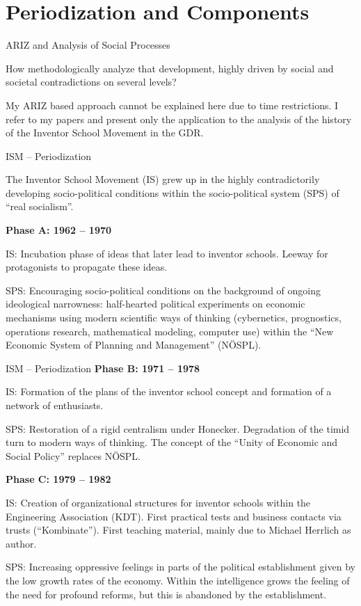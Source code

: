 \documentclass[11pt]{beamer}
\begin{document}
\section{Periodization and Components}
\begin{frame}{ARIZ and Analysis of Social Processes}

  How methodologically analyze that development, highly driven by
  social and societal contradictions on several levels? \medskip

  My ARIZ based approach cannot be explained here due to time restrictions. I
  refer to my papers and present only the application to the analysis of the
  history of the Inventor School Movement in the GDR.

\end{frame}

\begin{frame}{ISM -- Periodization}

  The Inventor School Movement (IS) grew up in the highly contradictorily
  developing socio-political conditions within the socio-political system
  (SPS) of ``real socialism''.  \vfill

  \small
   
  \textbf{Phase A: 1962 -- 1970}

  IS: Incubation phase of ideas that later lead to inventor schools.  Leeway
  for protagonists to propagate these ideas.
   
  SPS: Encouraging socio-political conditions on the background of ongoing
  ideological narrowness: half-hearted political experiments on economic
  mechanisms using modern scientific ways of thinking (cybernetics,
  prognostics, operations research, mathematical modeling, computer use)
  within the ``New Economic System of Planning and Management'' (NÖSPL).
\end{frame}

\begin{frame}{ISM -- Periodization}
\small
  \textbf{Phase B: 1971 -- 1978}

  IS: Formation of the plans of the inventor school concept and formation of a
  network of enthusiasts.

  SPS: Restoration of a rigid centralism under Honecker. Degradation of the
  timid turn to modern ways of thinking. The concept of the ``Unity of
  Economic and Social Policy'' replaces NÖSPL.
  
  \textbf{Phase C: 1979 -- 1982}

  IS: Creation of organizational structures for inventor schools within the
  Engineering Association (KDT). First practical tests and business contacts
  via trusts (``Kombinate''). First teaching material, mainly due to
  Michael Herrlich as author.

  SPS: Increasing oppressive feelings in parts of the political establishment
  given by the low growth rates of the economy. Within the intelligence grows
  the feeling of the need for profound reforms, but this is abandoned by the
  establishment.

\end{frame}
\end{document}
